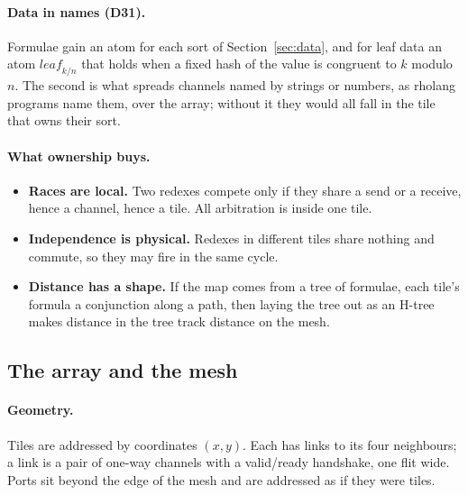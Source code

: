 \documentclass[10.5pt,a4paper]{extarticle}
\newcommand{\dec}[1]{\textbf{D#1}}
\theoremstyle{definition}
\theoremstyle{remark}
\begin{document}
\paragraph{Data in names (\dec{31}).} Formulae gain an atom for each sort of
Section~\ref{sec:data}, and for leaf data an atom $\mathit{leaf}_{k/n}$ that
holds when a fixed hash of the value is congruent to $k$ modulo $n$. The
second is what spreads channels named by strings or numbers, as rholang
programs name them, over the array; without it they would all fall in the
tile that owns their sort.

\paragraph{What ownership buys.}
\begin{itemize}
\item \textbf{Races are local.} Two redexes compete only if they share a send
or a receive, hence a channel, hence a tile. All arbitration is inside one
tile.
\item \textbf{Independence is physical.} Redexes in different tiles share
nothing and commute, so they may fire in the same cycle.
\item \textbf{Distance has a shape.} If the map comes from a tree of formulae,
each tile's formula a conjunction along a path, then laying the tree out as
an H-tree makes distance in the tree track distance on the mesh.
\end{itemize}

\subsection{The array and the mesh}\label{sec:mesh}

\paragraph{Geometry.} Tiles are addressed by coordinates $(x,y)$. Each has
links to its four neighbours; a link is a pair of one-way channels with a
valid/ready handshake, one flit wide. Ports sit beyond the edge of the mesh
and are addressed as if they were tiles.
\end{document}
